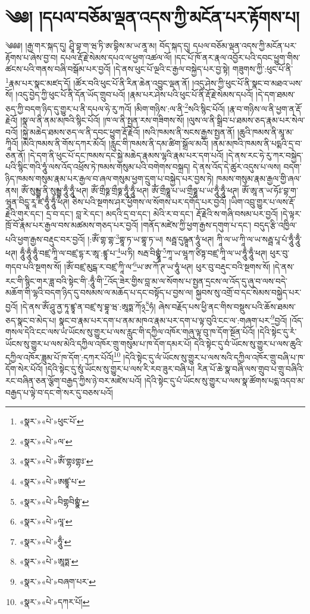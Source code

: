 \chapter{༄༅། །དཔལ་བཅོམ་ལྡན་འདས་ཀྱི་མངོན་པར་རྟོགས་པ།}༄༅༅། །རྒྱ་གར་སྐད་དུ། ཤྲཱི་བྷ་ག་ཝ་ཏི་ཨ་བྷིས་མ་ཡ་ནཱ་མ། བོད་སྐད་དུ། དཔལ་བཅོམ་ལྡན་འདས་ཀྱི་མངོན་པར་རྟོགས་པ་ཞེས་བྱ་བ། དཔལ་རྡོ་རྗེ་སེམས་དཔའ་ལ་ཕྱག་འཚལ་ལོ། །དང་པོ་ཁོ་ནར་རྣལ་འབྱོར་པའི་དབང་ཕྱུག་གིས་ཚངས་པའི་གནས་བཞི་བསྒོམ་པར་བྱའོ། །དེ་ནས་ཕུང་པོ་ལྔའི་ང་རྒྱལ་བསྐྱེད་པར་བྱ་སྟེ། གཟུགས་ཀྱི་:ཕུང་པོ་ནི་\footnote{«སྣར་»«པེ་»ཕུང་པོ་}རྣམ་པར་སྣང་མཛད་དོ། །ཚོར་བའི་ཕུང་པོ་ནི་རིན་ཆེན་འབྱུང་ལྡན་ནོ། །འདུ་ཤེས་ཀྱི་ཕུང་པོ་ནི་སྣང་བ་མཐའ་ཡས་སོ། །འདུ་བྱེད་ཀྱི་ཕུང་པོ་ནི་དོན་ཡོད་གྲུབ་པའོ། །རྣམ་པར་ཤེས་པའི་ཕུང་པོ་ནི་རྡོ་རྗེ་སེམས་དཔའོ། །དེ་དག་ཐམས་ཅད་ཀྱི་བདག་ཉིད་དུ་གྱུར་པ་ནི་དཔལ་ཧེ་རུ་ཀའོ། །མིག་གཉིས་:ལ་ནི་\footnote{«སྣར་»«པེ་»ལ་}སའི་སྙིང་པོའོ། །རྣ་བ་གཉིས་ལ་ནི་ཕྱག་ན་རྡོ་རྗེའོ། །སྣ་ལ་ནི་ནམ་མཁའི་སྙིང་པོའོ། །ཁ་ལ་ནི་སྤྱན་རས་གཟིགས་སོ། །ལུས་ལ་ནི་སྒྲིབ་པ་ཐམས་ཅད་རྣམ་པར་སེལ་བའོ། །སྐྱེ་མཆེད་ཐམས་ཅད་ལ་ནི་དབང་ཕྱུག་རྡོ་རྗེའོ། །སའི་ཁམས་ནི་སངས་རྒྱས་སྤྱན་ནོ། །ཆུའི་ཁམས་ནི་མཱ་མ་ཀཱིའོ། །མེའི་ཁམས་ནི་གོས་དཀར་མོའོ། །རླུང་གི་ཁམས་ནི་དམ་ཚིག་སྒྲོལ་མའོ། །ནམ་མཁའི་ཁམས་ནི་པདྨའི་དྲ་བ་ཅན་ནོ། །དེ་དག་ནི་ཕུང་པོ་དང་ཁམས་དང་སྐྱེ་མཆེད་རྣམས་ལྷའི་རྣམ་པར་དག་པའོ། །དེ་ནས་རང་ཧེ་རུ་ཀར་བསྐྱེད་པའི་སྙིང་གའི་ཧཱུཾ་ལས་འོད་འཕྲོས་ཏེ་ཁམས་གསུམ་པའི་བགེགས་བསྐྲད། དེ་ནས་འོད་དེ་ཚུར་འདུས་པ་ལས། བདག་ཉིད་ཁམས་གསུམ་རྣམ་པར་རྒྱལ་བ་ཞལ་གསུམ་ཕྱག་དྲུག་པ་བསྐྱེད་པར་བྱས་ཏེ། ཁམས་གསུམ་རྣམ་རྒྱལ་གྱི་ཞལ་ནས། ཨོཾ་སུམྦྷ་ནི་སུམྦྷ་ཧཱུྃ་ཧཱུྃ་ཕཊ། ཨོཾ་གྲྀཧྞ་གྲྀཧྞ་ཧཱུྃ་ཧཱུྃ་ཕཊ། ཨོཾ་གྲྀཧྞཱ་པ་ཡ་གྲྀཧྞཱ་པ་ཡ་ཧཱུྃ་ཧཱུྃ་ཕཊ། ཨོཾ་ཨཱ་ན་ཡ་ཧོཿ་བྷ་ག་ཝཱན་བིདྱཱ་རཱ་ཛ་ཧཱུྃ་ཧཱུྃ་ཕཊ། ཅེས་པའི་སྔགས་ཤར་ཕྱོགས་ལ་སོགས་པར་དགོད་པར་བྱའོ། །ཡིག་འབྲུ་གྱུར་པ་ལས་རྡོ་རྗེའི་གུར་དང་། དྲ་བ་དང་། བླ་རེ་དང་། མདའི་དྲ་བ་དང་། མེའི་ར་བ་དང་། རྡོ་རྗེའི་ས་གཞི་བསམ་པར་བྱའོ། །དེ་ལྟར་ཁྲོ་བོ་རྣམ་པར་རྒྱལ་བས་མཚམས་གཅད་པར་བྱའོ། །གནོད་མཛེས་ཀྱི་ཕྱག་རྒྱས་དགུག་པ་དང་། བདུད་རྩི་འཁྱིལ་པའི་ཕྱག་རྒྱས་བརྡུང་བར་བྱའོ། །:ཨོཾ་གྷ་གྷ་\footnote{«སྣར་»«པེ་»ཨོཾ་གྷཿགྷཿ་}གྷཱ་ཏ་ཡ་གྷཱ་ཏ་ཡ། སརྦྦ་དུཥྚཱན་ཧཱུཾ་ཕཊ། ཀཱི་ལ་ཡ་ཀཱི་ལ་ཡ་སརྦྦ་པཱ་པཾ་ཧཱུྃ་ཧཱུྃ་ཕཊ། ཧཱུྃ་ཧཱུྃ་ཧཱུྃ་བཛྲ་ཀཱི་ལ་བཛྲ་དྷ་ར་ཨཱ་:ཛྙཱ་པ་\footnote{«སྣར་»«པེ་»ཨཛྙཱ་པ་}ཡ་ཏི། སརྦ་བིགྷྣཱཾ་\footnote{«སྣར་»«པེ་»བིགྷབིགྷྣཾ་}ཀཱ་ཡ་ཝཱཀ་ཙིཏྟ་བཛྲ་ཀཱི་ལ་ཡ་ཧཱུྃ་ཧཱུྃ་ཕཊ། ཕུར་བུ་གདབ་པའི་སྔགས་སོ། །ཨོཾ་བཛྲ་མུངྒ་ར་བཛྲ་ཀཱི་ལ་\footnote{«སྣར་»«པེ་»ལཱ་}ཡ་ཨ་ཀོ་ཊ་ཡ་ཧཱུཾ་ཕཊ། ཕུར་བུ་བརྡུང་བའི་སྔགས་སོ། །དེ་ནས་རང་གི་སྙིང་གར་ཟླ་བའི་སྟེང་གི་:ཧཱུྃ་གི་\footnote{«སྣར་»«པེ་»ཧཱུྃ་}འོད་ཟེར་གྱིས་བླ་མ་ལ་སོགས་པ་སྤྱན་དྲངས་ལ་འོད་དུ་ཞུ་བ་ལས་བདེ་མཆོག་གི་ལྷའི་བདག་ཉིད་དུ་བསམས་ལ་མཆོད་པ་དང་བསྟོད་པ་བྱས་ལ། སྐྱབས་སུ་འགྲོ་བ་དང་སེམས་བསྐྱེད་པར་བྱའོ། །དེ་ནས་ཨོཾ་ཤཱུ་ནྱ་ཏཱ་ཛྙཱ་ན་བཛྲ་སྭ་བྷཱ་ཝ་:ཨཱཏྨ་ཀོ྅\footnote{«སྣར་»«པེ་»ཨཱཏྨ་}ཧཾ། ཞེས་བརྗོད་པས་ཕྱི་ནང་གིས་བསྡུས་པའི་ཆོས་ཐམས་ཅད་སྣང་བ་མེད་པ། སྣང་བ་རྣམ་པར་དག་པ་ནམ་མཁའ་རྣམ་པར་དག་པ་ལྟ་བུའི་ངང་ལ་:གཞག་པར་\footnote{«སྣར་»«པེ་»བཞག་པར་}བྱའོ། །འོད་གསལ་དེའི་ངང་ལས་ཡཾ་ཡོངས་སུ་གྱུར་པ་ལས་རླུང་གི་དཀྱིལ་འཁོར་གཞུ་ལྟ་བུ་ཁ་དོག་སྔོན་པོའོ། །དེའི་སྟེང་དུ་རཾ་ཡོངས་སུ་གྱུར་པ་ལས་མེའི་དཀྱིལ་འཁོར་གྲུ་གསུམ་པ་ཁ་དོག་དམར་པོ། དེའི་སྟེང་དུ་བཾ་ཡོངས་སུ་གྱུར་པ་ལས་ཆུའི་དཀྱིལ་འཁོར་ཟླུམ་པོ་ཁ་དོག་:དཀར་པོའོ།\footnote{«སྣར་»«པེ་»དཀར་པོ།} །དེའི་སྟེང་དུ་ལཾ་ཡོངས་སུ་གྱུར་པ་ལས་སའི་དཀྱིལ་འཁོར་གྲུ་བཞི་པ་ཁ་དོག་སེར་པོའོ། །དེའི་སྟེང་དུ་སུཾ་ཡོངས་སུ་གྱུར་པ་ལས་རི་རབ་ཟུར་བཞི་པ། རིན་པོ་ཆེ་སྣ་བཞི་ལས་གྲུབ་པ་གྲུ་བཞིའི་རང་བཞིན་ཅན་ལྕོག་བརྒྱད་ཀྱིས་ཉེ་བར་མཛེས་པའོ། །དེའི་སྟེང་དུ་པཾ་ཡོངས་སུ་གྱུར་པ་ལས་སྣ་ཚོགས་པདྨ་འདབ་མ་བརྒྱད་པ་ལྟེ་བ་དང་གེ་སར་དུ་བཅས་པའོ། 